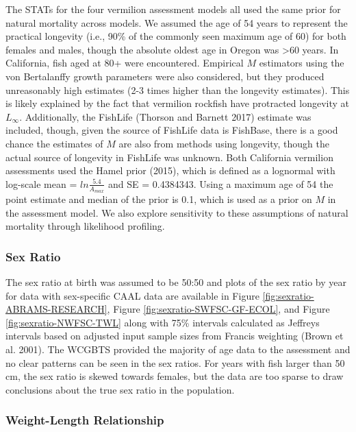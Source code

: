 \documentclass[
  english,
  a4paper,
]{article}
\begin{document}
The STATs for the four vermilion assessment models all used the same prior for
natural mortality across models. We assumed the age of 54 years to represent the practical
longevity (i.e., 90\% of
the commonly seen maximum age of 60) for both females and males, though the absolute
oldest age in Oregon was \textgreater60 years. In California, fish aged at 80+ were encountered.
Empirical \(M\) estimators using the von Bertalanffy growth parameters were also considered, but they produced unreasonably high estimates (2-3 times higher than the longevity estimates). This is likely explained by the fact that vermilion rockfish have protracted longevity at \(L_{\infty}\). Additionally, the FishLife (Thorson and Barnett 2017) estimate was included, though, given
the source of FishLife data is FishBase, there is a good chance the estimates of
\(M\) are also from methods using longevity, though the actual source of longevity
in FishLife was unknown.
Both California vermilion assessments used the Hamel prior (2015), which
is defined as a lognormal with log-scale mean = \(ln\frac{5.4}{A_{max}}\) and SE = 0.4384343.
Using a maximum age of 54 the point estimate and median of the prior is 0.1, which
is used as a prior on \(M\) in the assessment model. We also explore sensitivity to
these assumptions of natural mortality through likelihood profiling.

\hypertarget{sex-ratio}{%
\subsubsection{Sex Ratio}\label{sex-ratio}}

The sex ratio at birth was assumed to be 50:50 and plots of the sex ratio by year for data with sex-specific CAAL data are available in Figure \ref{fig:sexratio-ABRAMS-RESEARCH}, Figure \ref{fig:sexratio-SWFSC-GF-ECOL}, and
Figure \ref{fig:sexratio-NWFSC-TWL} along with 75\% intervals calculated as Jeffreys intervals based on adjusted input sample sizes from Francis weighting (Brown et al. 2001). The WCGBTS provided the majority of age data to the assessment and no clear patterns can be seen in the sex ratios. For years with fish larger than 50 cm, the sex ratio is skewed towards females, but the data are too sparse to draw conclusions about the true sex ratio in the population.

\hypertarget{weight-length-relationship}{%
\subsubsection{Weight-Length Relationship}\label{weight-length-relationship}}
\end{document}

